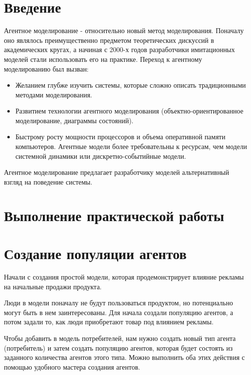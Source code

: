 \graphicspath{{./third/img/}} %

\section*{\LARGE Введение}
Агентное моделирование - относительно новый метод моделирования.
Поначалу оно являлось преимущественно предметом теоретических дискуссий в
академических кругах, а начиная с 2000-х годов разработчики имитационных
моделей стали использовать его на практике.
Переход к агентному моделированию был вызван:

\begin{itemize}
	\item Желанием глубже изучить системы, которые сложно описать
		традиционными методами моделирования.
	\item Развитием технологии агентного моделирования
		(объектно-ориентированное моделирование, диаграммы состояний).
	\item Быстрому росту мощности процессоров и объема оперативной памяти
		компьютеров. Агентные модели более требовательны к ресурсам, чем
		модели системной динамики или дискретно-событийные модели.
\end{itemize}

Агентное моделирование предлагает разработчику моделей альтернативный
взгляд на поведение системы.

\clearpage

\section*{\LARGE Выполнение практической работы}

\section{Создание популяции агентов}
Начали с создания простой модели, которая продемонстрирует влияние
рекламы на начальные продажи продукта.\par
Люди в модели поначалу не будут пользоваться продуктом, но
потенциально могут быть в нем заинтересованы. Для начала создали
популяцию агентов, а потом задали то, как люди приобретают товар под
влиянием рекламы.\par
Чтобы добавить в модель потребителей, нам нужно создать новый тип
агента (потребитель) и затем создать популяцию агентов, которая будет состоять
из заданного количества агентов этого типа. Можно выполнить оба этих
действия с помощью удобного мастера создания агентов.\par

